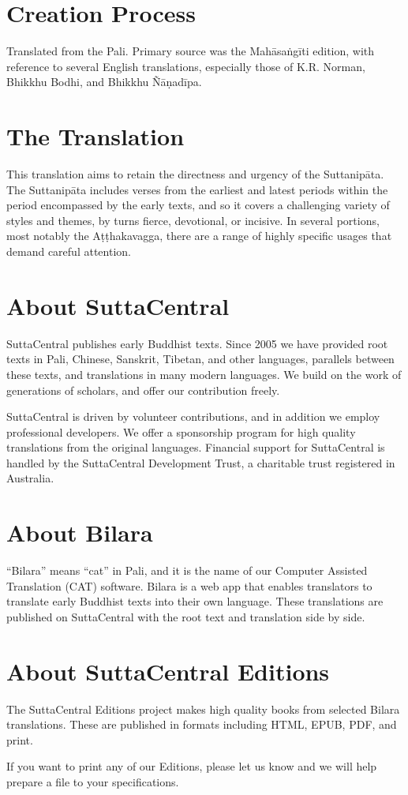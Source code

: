 \documentclass[12pt,openany]{book}%
\begin{document}
\section*{Creation Process}

Translated from the Pali. Primary source was the \textsanskrit{Mahāsaṅgīti} edition, with reference to several English translations, especially those of K.R. Norman, Bhikkhu Bodhi, and Bhikkhu \textsanskrit{Ñāṇadīpa}.

\section*{The Translation}

This translation aims to retain the directness and urgency of the \textsanskrit{Suttanipāta}. The \textsanskrit{Suttanipāta} includes verses from the earliest and latest periods within the period encompassed by the early texts, and so it covers a challenging variety of styles and themes, by turns fierce, devotional, or incisive. In several portions, most notably the \textsanskrit{Aṭṭhakavagga}, there are a range of highly specific usages that demand careful attention.

\section*{About SuttaCentral}

SuttaCentral publishes early Buddhist texts. Since 2005 we have provided root texts in Pali, Chinese, Sanskrit, Tibetan, and other languages, parallels between these texts, and translations in many modern languages. We build on the work of generations of scholars, and offer our contribution freely.

SuttaCentral is driven by volunteer contributions, and in addition we employ professional developers. We offer a sponsorship program for high quality translations from the original languages. Financial support for SuttaCentral is handled by the SuttaCentral Development Trust, a charitable trust registered in Australia.

\section*{About Bilara}

“Bilara” means “cat” in Pali, and it is the name of our Computer Assisted Translation (CAT) software. Bilara is a web app that enables translators to translate early Buddhist texts into their own language. These translations are published on SuttaCentral with the root text and translation side by side.

\section*{About SuttaCentral Editions}

The SuttaCentral Editions project makes high quality books from selected Bilara translations. These are published in formats including HTML, EPUB, PDF, and print.

If you want to print any of our Editions, please let us know and we will help prepare a file to your specifications.

%
\end{document}
